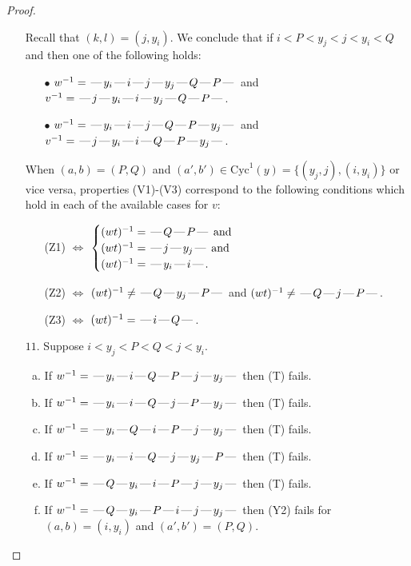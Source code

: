\documentclass[10pt]{article}
\theoremstyle{definition}
\theoremstyle{definition}
\def\dash{\text{\hspace{0.5mm}---\hspace{0.5mm}}}
\def\Cyc{\mathrm{Cyc}}
\begin{document}
\begin{proof}
\begin{enumerate}
\begin{enumerate}[(a)]
\end{enumerate}
Recall that $(k,l) = (j,y_i)$.
We conclude that if $i < P < y_j < j < y_i < Q$ and then one of the following holds:
\begin{enumerate}
\item[$\bullet$] $w^{-1} = \dash y_i\dash i\dash j\dash y_j\dash Q\dash P\dash $ and $v^{-1} = \dash j\dash y_i\dash i\dash y_j\dash Q\dash P\dash $.
\item[$\bullet$] $w^{-1} = \dash y_i\dash i\dash j\dash Q\dash P\dash y_j\dash $ and $v^{-1} = \dash j\dash y_i\dash i\dash Q\dash P\dash y_j\dash $.
\end{enumerate}
When $(a,b)= (P,Q)$ and $(a',b')\in \Cyc^1(y)=\{(y_j,j),(i,y_i)\}$ or vice versa,
properties (V1)-(V3) correspond to the following conditions which hold in
each of the available cases for $v$:
\begin{enumerate}
\item[](Z1) $\Leftrightarrow$ $\begin{cases}\text{$(wt)^{-1} = \dash Q \dash P \dash$}\text{ and }\\
\text{$(wt)^{-1} = \dash j \dash y_j \dash$}\text{ and }\\
\text{$(wt)^{-1} = \dash y_i \dash i \dash$}.\end{cases}$
\item[](Z2) $\Leftrightarrow$ $(wt)^{-1} \neq \dash Q \dash y_j \dash P \dash$ and $(wt)^{-1}\neq \dash Q \dash j \dash P \dash$.
\item[](Z3) $\Leftrightarrow$ $(wt)^{-1} = \dash i \dash Q \dash$.
\end{enumerate}
\item[$11$.] Suppose $i < y_j < P < Q < j < y_i$.
\begin{enumerate}[(a)]
\item If $w^{-1} = \dash y_i\dash i\dash Q\dash P\dash j\dash y_j\dash $ then (T) fails.
\item If $w^{-1} = \dash y_i\dash i\dash Q\dash j\dash P\dash y_j\dash $ then (T) fails.
\item If $w^{-1} = \dash y_i\dash Q\dash i\dash P\dash j\dash y_j\dash $ then (T) fails.
\item If $w^{-1} = \dash y_i\dash i\dash Q\dash j\dash y_j\dash P\dash $ then (T) fails.
\item If $w^{-1} = \dash Q\dash y_i\dash i\dash P\dash j\dash y_j\dash $ then (T) fails.
\item If $w^{-1} = \dash Q\dash y_i\dash P\dash i\dash j\dash y_j\dash $ then (Y2) fails for $(a,b)=(i,y_i)$ and $(a',b')=(P,Q)$.

\end{enumerate}
\end{enumerate}
\end{proof}
\end{document}
